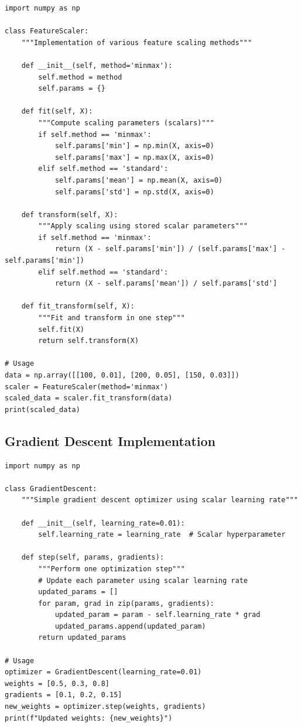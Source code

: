 \documentclass[11pt,a4paper]{article}
\begin{document}
\begin{lstlisting}
import numpy as np

class FeatureScaler:
    """Implementation of various feature scaling methods"""
    
    def __init__(self, method='minmax'):
        self.method = method
        self.params = {}
    
    def fit(self, X):
        """Compute scaling parameters (scalars)"""
        if self.method == 'minmax':
            self.params['min'] = np.min(X, axis=0)
            self.params['max'] = np.max(X, axis=0)
        elif self.method == 'standard':
            self.params['mean'] = np.mean(X, axis=0)
            self.params['std'] = np.std(X, axis=0)
    
    def transform(self, X):
        """Apply scaling using stored scalar parameters"""
        if self.method == 'minmax':
            return (X - self.params['min']) / (self.params['max'] - self.params['min'])
        elif self.method == 'standard':
            return (X - self.params['mean']) / self.params['std']
    
    def fit_transform(self, X):
        """Fit and transform in one step"""
        self.fit(X)
        return self.transform(X)

# Usage
data = np.array([[100, 0.01], [200, 0.05], [150, 0.03]])
scaler = FeatureScaler(method='minmax')
scaled_data = scaler.fit_transform(data)
print(scaled_data)
\end{lstlisting}

\subsection{Gradient Descent Implementation}

\begin{lstlisting}
import numpy as np

class GradientDescent:
    """Simple gradient descent optimizer using scalar learning rate"""
    
    def __init__(self, learning_rate=0.01):
        self.learning_rate = learning_rate  # Scalar hyperparameter
    
    def step(self, params, gradients):
        """Perform one optimization step"""
        # Update each parameter using scalar learning rate
        updated_params = []
        for param, grad in zip(params, gradients):
            updated_param = param - self.learning_rate * grad
            updated_params.append(updated_param)
        return updated_params

# Usage
optimizer = GradientDescent(learning_rate=0.01)
weights = [0.5, 0.3, 0.8]
gradients = [0.1, 0.2, 0.15]
new_weights = optimizer.step(weights, gradients)
print(f"Updated weights: {new_weights}")
\end{lstlisting}
\end{document}
